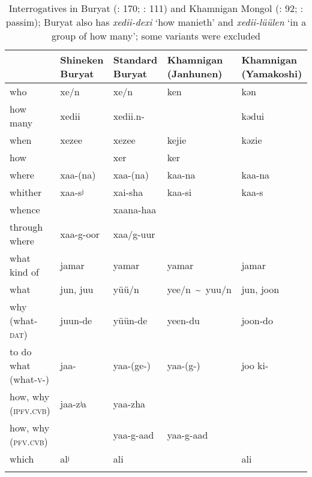 \begin{table}
\caption{Interrogatives in Buryat (\citealt{Yamakoshi2011a}: 170; \citealt{Skribnik2003}: 111) and Khamnigan Mongol (\citealt{Janhunen2003c}: 92; \citealt{Yamakoshi2007a}: passim); Buryat also has \textit{xedii-dexi} ‘how manieth’ and \textit{xedii-lüülen} ‘in a group of how many’; some variants were excluded}
\label{tab:mong:18}

\begin{tabularx}{\textwidth}{lQQQQ}
\lsptoprule
& \textbf{Shineken Buryat} & \textbf{Standard Buryat} & \textbf{Khamnigan}
\textbf{(Janhunen)} & \textbf{Khamnigan (Yamakoshi)}\\
\midrule
who & xe/n & xe/n & ken & kən\\
how many & xedii & xedii.n- &  & kədui\\
when & xezee & xezee & kejie & kəzie\\
how &  & xer & ker & \\
where & xaa-(na) & xaa-(na) & kaa-na & kaa-na\\
whither & xaa-sʲ & xai-sha & kaa-si & kaa-s\\
whence &  & xaana-haa &  & \\
through where & xaa-g-oor & xaa/g-uur &  & \\
what kind of & jamar & yamar & yamar & jamar\\
what & jun, juu & yüü/n & \mbox{yee/n {\textasciitilde} yuu/n} & jun, joon\\
why (what-\textsc{dat}) & juun-de & yüün-de & yeen-du & joon-do\\
to do what (what-\textsc{v}-) & jaa- & yaa-(ge-) & yaa-(g-) & joo ki-\\
how, why (\textsc{ipfv}.\textsc{cvb}) & jaa-zʲa & yaa-zha &  & \\
how, why (\textsc{pfv}.\textsc{cvb}) &  & yaa-g-aad & yaa-g-aad & \\
which & alʲ & ali &  & ali\\
\lspbottomrule
\end{tabularx}
\end{table}

